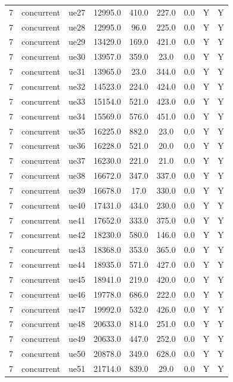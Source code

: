 \begin{table}[ht]
\begin{tabular}{|c|c|c|c|c|c|c|c|c|}
7 & concurrent & ue27 & 12995.0 & 410.0 & 227.0 & 0.0 & Y & Y \\
7 & concurrent & ue28 & 12995.0 & 96.0 & 225.0 & 0.0 & Y & Y \\
7 & concurrent & ue29 & 13429.0 & 169.0 & 421.0 & 0.0 & Y & Y \\
7 & concurrent & ue30 & 13957.0 & 359.0 & 23.0 & 0.0 & Y & Y \\
7 & concurrent & ue31 & 13965.0 & 23.0 & 344.0 & 0.0 & Y & Y \\
7 & concurrent & ue32 & 14523.0 & 224.0 & 424.0 & 0.0 & Y & Y \\
7 & concurrent & ue33 & 15154.0 & 521.0 & 423.0 & 0.0 & Y & Y \\
7 & concurrent & ue34 & 15569.0 & 576.0 & 451.0 & 0.0 & Y & Y \\
7 & concurrent & ue35 & 16225.0 & 882.0 & 23.0 & 0.0 & Y & Y \\
7 & concurrent & ue36 & 16228.0 & 521.0 & 20.0 & 0.0 & Y & Y \\
7 & concurrent & ue37 & 16230.0 & 221.0 & 21.0 & 0.0 & Y & Y \\
7 & concurrent & ue38 & 16672.0 & 347.0 & 337.0 & 0.0 & Y & Y \\
7 & concurrent & ue39 & 16678.0 & 17.0 & 330.0 & 0.0 & Y & Y \\
7 & concurrent & ue40 & 17431.0 & 434.0 & 230.0 & 0.0 & Y & Y \\
7 & concurrent & ue41 & 17652.0 & 333.0 & 375.0 & 0.0 & Y & Y \\
7 & concurrent & ue42 & 18230.0 & 580.0 & 146.0 & 0.0 & Y & Y \\
7 & concurrent & ue43 & 18368.0 & 353.0 & 365.0 & 0.0 & Y & Y \\
7 & concurrent & ue44 & 18935.0 & 571.0 & 427.0 & 0.0 & Y & Y \\
7 & concurrent & ue45 & 18941.0 & 219.0 & 420.0 & 0.0 & Y & Y \\
7 & concurrent & ue46 & 19778.0 & 686.0 & 222.0 & 0.0 & Y & Y \\
7 & concurrent & ue47 & 19992.0 & 532.0 & 426.0 & 0.0 & Y & Y \\
7 & concurrent & ue48 & 20633.0 & 814.0 & 251.0 & 0.0 & Y & Y \\
7 & concurrent & ue49 & 20633.0 & 447.0 & 252.0 & 0.0 & Y & Y \\
7 & concurrent & ue50 & 20878.0 & 349.0 & 628.0 & 0.0 & Y & Y \\
7 & concurrent & ue51 & 21714.0 & 839.0 & 29.0 & 0.0 & Y & Y \\

\end{tabular}
\end{table}
